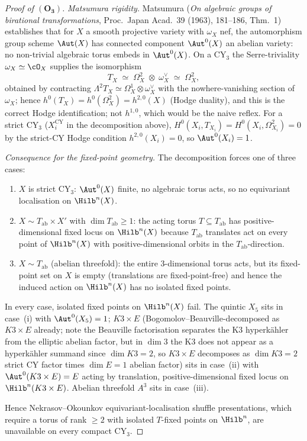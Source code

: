 \begin{proof}[Proof of $(\mathbf{O_3})$]
\emph{Matsumura rigidity.}
Matsumura (\emph{On algebraic groups of birational transformations},
Proc.\ Japan Acad.\ 39 (1963), 181--186, Thm.~1) establishes that for
$X$ a smooth projective variety with $\omega_X$ nef, the automorphism
group scheme $\Aut(X)$ has connected component $\Aut^0(X)$ an abelian
variety: no non-trivial algebraic torus embeds in $\Aut^0(X)$. On a
CY$_3$ the Serre-triviality $\omega_X \simeq \cO_X$ supplies the
isomorphism
\[
 T_X \;\simeq\; \Omega^2_X \;\otimes\; \omega_X^\vee
 \;\simeq\; \Omega^2_X,
\]
obtained by contracting $\Lambda^2 T_X \simeq \Omega^1_X \otimes
\omega_X^\vee$ with the nowhere-vanishing section of $\omega_X$; hence
$h^0(T_X) = h^0(\Omega^2_X) = h^{2,0}(X)$ (Hodge duality), and this is
the correct Hodge identification; not $h^{1,0}$, which would be the
naive reflex. For a strict CY$_3$ ($X_i^{\mathrm{CY}}$ in the
decomposition above),
$H^0(X_i, T_{X_i}) = H^0(X_i, \Omega_{X_i}^2) = 0$ by the strict-CY
Hodge condition $h^{2,0}(X_i) = 0$, so $\Aut^0(X_i) = 1$.

\emph{Consequence for the fixed-point geometry.}
The decomposition forces one of three cases:
\begin{enumerate}[leftmargin=2em]
\item $X$ is strict CY$_3$: $\Aut^0(X)$ finite, no algebraic torus
 acts, so no equivariant localisation on $\Hilb^n(X)$.
\item $X \sim T_\mathrm{ab} \times X'$ with $\dim T_\mathrm{ab} \geq 1$:
 the acting torus $T \subseteq T_\mathrm{ab}$ has positive-dimensional
 fixed locus on $\Hilb^n(X)$ because $T_\mathrm{ab}$ translates act on
 every point of $\Hilb^n(X)$ with positive-dimensional orbits in the
 $T_\mathrm{ab}$-direction.
\item $X \sim T_\mathrm{ab}$ (abelian threefold): the entire
 $3$-dimensional torus acts, but its fixed-point set on $X$ is empty
 (translations are fixed-point-free) and hence the induced action on
 $\Hilb^n(X)$ has no isolated fixed points.
\end{enumerate}

In every case, isolated fixed points on $\Hilb^n(X)$ fail. The quintic
$X_5$ sits in case~(i) with $\Aut^0(X_5) = 1$; $K3 \times E$
(Bogomolov--Beauville-decomposed as $K3 \times E$ already; note the
Beauville factorisation separates the K3 hyperkähler from the elliptic
abelian factor, but in $\dim 3$ the K3 does not appear as a
hyperkähler summand since $\dim K3 = 2$, so $K3\times E$ decomposes as
$\dim K3 = 2$ strict CY factor times $\dim E = 1$ abelian factor) sits
in case~(ii) with $\Aut^0(K3 \times E) = E$ acting by translation,
positive-dimensional fixed locus on $\Hilb^n(K3 \times E)$. Abelian
threefold $A^3$ sits in case~(iii).

Hence Nekrasov--Okounkov equivariant-localisation shuffle presentations,
which require a torus of rank $\geq 2$ with isolated $T$-fixed points
on $\Hilb^n$, are unavailable on every compact CY$_3$.
\end{proof}

